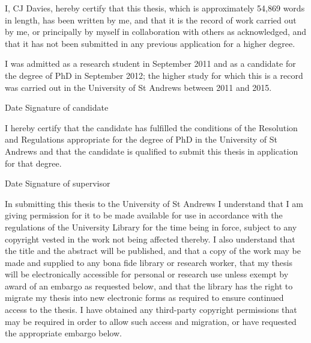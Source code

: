 

I, CJ Davies, hereby certify that this thesis, which is approximately 54,869 words in length, has been written by me, and that it is the record of work carried out by me, or principally by myself in collaboration with others as acknowledged, and that it has not been submitted in any previous application for a higher degree. 

I was admitted as a research student in September 2011 and as a candidate for the degree of PhD in September 2012; the higher study for which this is a record was carried out in the University of St Andrews between 2011 and 2015. 

\vspace{5mm}

Date \hspace{35mm} Signature of candidate

\vspace{10mm}



I hereby certify that the candidate has fulfilled the conditions of the Resolution and Regulations appropriate for the degree of PhD in the University of St Andrews and that the candidate is qualified to submit this thesis in application for that degree. 

\vspace{5mm}

Date \hspace{35mm} Signature of supervisor

\vspace{10mm}



In submitting this thesis to the University of St Andrews I understand that I am giving permission for it to be made available for use in accordance with the regulations of the University Library for the time being in force, subject to any copyright vested in the work not being affected thereby.  I also understand that the title and the abstract will be published, and that a copy of the work may be made and supplied to any bona fide library or research worker, that my thesis will be electronically accessible for personal or research use unless exempt by award of an embargo as requested below, and that the library has the right to migrate my thesis into new electronic forms as required to ensure continued access to the thesis. I have obtained any third-party copyright permissions that may be required in order to allow such access and migration, or have requested the appropriate embargo below. 

